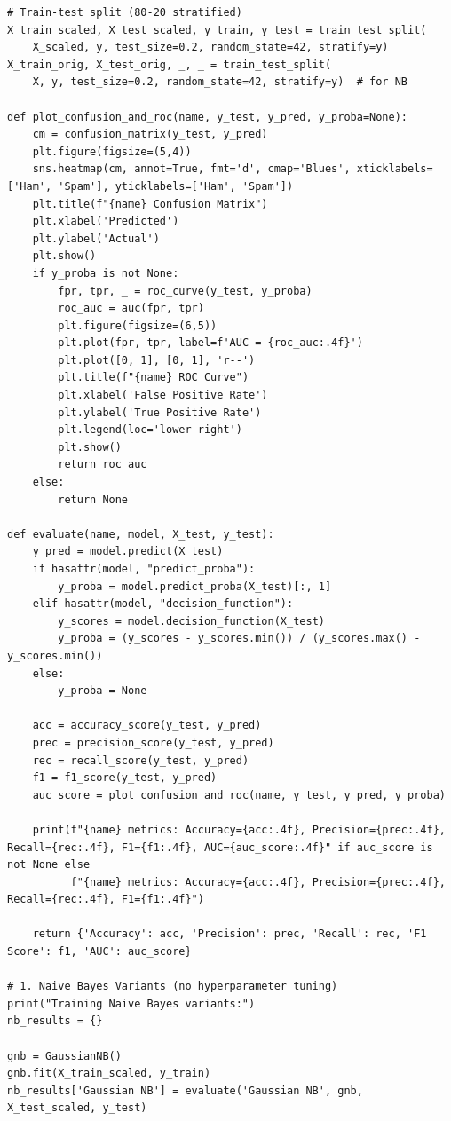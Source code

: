 \documentclass[12pt]{article}
\begin{document}
\begin{verbatim}
# Train-test split (80-20 stratified)
X_train_scaled, X_test_scaled, y_train, y_test = train_test_split(
    X_scaled, y, test_size=0.2, random_state=42, stratify=y)
X_train_orig, X_test_orig, _, _ = train_test_split(
    X, y, test_size=0.2, random_state=42, stratify=y)  # for NB

def plot_confusion_and_roc(name, y_test, y_pred, y_proba=None):
    cm = confusion_matrix(y_test, y_pred)
    plt.figure(figsize=(5,4))
    sns.heatmap(cm, annot=True, fmt='d', cmap='Blues', xticklabels=['Ham', 'Spam'], yticklabels=['Ham', 'Spam'])
    plt.title(f"{name} Confusion Matrix")
    plt.xlabel('Predicted')
    plt.ylabel('Actual')
    plt.show()
    if y_proba is not None:
        fpr, tpr, _ = roc_curve(y_test, y_proba)
        roc_auc = auc(fpr, tpr)
        plt.figure(figsize=(6,5))
        plt.plot(fpr, tpr, label=f'AUC = {roc_auc:.4f}')
        plt.plot([0, 1], [0, 1], 'r--')
        plt.title(f"{name} ROC Curve")
        plt.xlabel('False Positive Rate')
        plt.ylabel('True Positive Rate')
        plt.legend(loc='lower right')
        plt.show()
        return roc_auc
    else:
        return None

def evaluate(name, model, X_test, y_test):
    y_pred = model.predict(X_test)
    if hasattr(model, "predict_proba"):
        y_proba = model.predict_proba(X_test)[:, 1]
    elif hasattr(model, "decision_function"):
        y_scores = model.decision_function(X_test)
        y_proba = (y_scores - y_scores.min()) / (y_scores.max() - y_scores.min())
    else:
        y_proba = None

    acc = accuracy_score(y_test, y_pred)
    prec = precision_score(y_test, y_pred)
    rec = recall_score(y_test, y_pred)
    f1 = f1_score(y_test, y_pred)
    auc_score = plot_confusion_and_roc(name, y_test, y_pred, y_proba)

    print(f"{name} metrics: Accuracy={acc:.4f}, Precision={prec:.4f}, Recall={rec:.4f}, F1={f1:.4f}, AUC={auc_score:.4f}" if auc_score is not None else
          f"{name} metrics: Accuracy={acc:.4f}, Precision={prec:.4f}, Recall={rec:.4f}, F1={f1:.4f}")

    return {'Accuracy': acc, 'Precision': prec, 'Recall': rec, 'F1 Score': f1, 'AUC': auc_score}

# 1. Naive Bayes Variants (no hyperparameter tuning)
print("Training Naive Bayes variants:")
nb_results = {}

gnb = GaussianNB()
gnb.fit(X_train_scaled, y_train)
nb_results['Gaussian NB'] = evaluate('Gaussian NB', gnb, X_test_scaled, y_test)


\end{verbatim}
\end{document}

